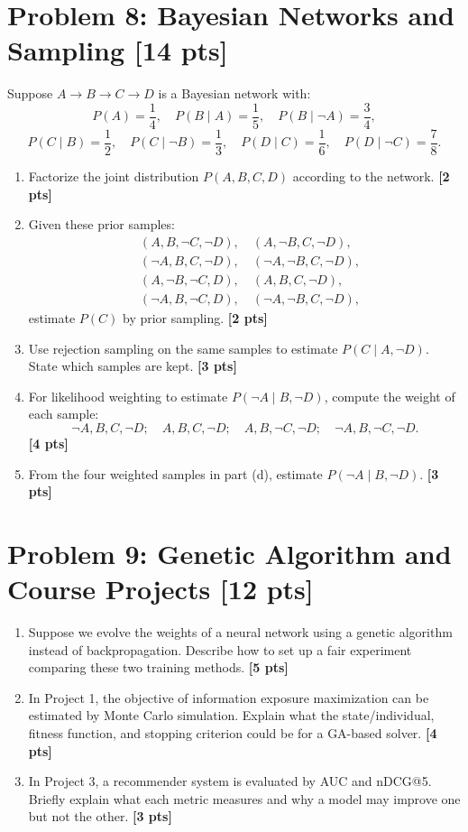 \documentclass[UTF8,11pt,a4paper]{ctexart}
\newcommand{\pts}[1]{\hfill{\bfseries [#1 pts]}}
\begin{document}
\section*{Problem 8: Bayesian Networks and Sampling \pts{14}}

Suppose $A\to B\to C\to D$ is a Bayesian network with:
\[
P(A)=\frac14,\quad
P(B\mid A)=\frac15,\quad P(B\mid \neg A)=\frac34,
\]
\[
P(C\mid B)=\frac12,\quad P(C\mid \neg B)=\frac13,\quad
P(D\mid C)=\frac16,\quad P(D\mid \neg C)=\frac78.
\]

\begin{enumerate}[label=(\alph*)]
\item Factorize the joint distribution $P(A,B,C,D)$ according to the network. \pts{2}
\item Given these prior samples:
\[
\begin{aligned}
&(A,B,\neg C,\neg D),\quad (A,\neg B,C,\neg D),\\
&(\neg A,B,C,\neg D),\quad (\neg A,\neg B,C,\neg D),\\
&(A,\neg B,\neg C,D),\quad (A,B,C,\neg D),\\
&(\neg A,B,\neg C,D),\quad (\neg A,\neg B,C,\neg D),
\end{aligned}
\]
estimate $P(C)$ by prior sampling. \pts{2}
\item Use rejection sampling on the same samples to estimate $P(C\mid A,\neg D)$. State which samples are kept. \pts{3}
\item For likelihood weighting to estimate $P(\neg A\mid B,\neg D)$, compute the weight of each sample:
\[
\neg A,B,C,\neg D;\quad A,B,C,\neg D;\quad A,B,\neg C,\neg D;\quad \neg A,B,\neg C,\neg D.
\]
\pts{4}
\item From the four weighted samples in part (d), estimate $P(\neg A\mid B,\neg D)$. \pts{3}
\end{enumerate}

\section*{Problem 9: Genetic Algorithm and Course Projects \pts{12}}

\begin{enumerate}[label=(\alph*)]
\item Suppose we evolve the weights of a neural network using a genetic algorithm instead of backpropagation. Describe how to set up a fair experiment comparing these two training methods. \pts{5}
\item In Project 1, the objective of information exposure maximization can be estimated by Monte Carlo simulation. Explain what the state/individual, fitness function, and stopping criterion could be for a GA-based solver. \pts{4}
\item In Project 3, a recommender system is evaluated by AUC and nDCG@5. Briefly explain what each metric measures and why a model may improve one but not the other. \pts{3}
\end{enumerate}
\end{document}
